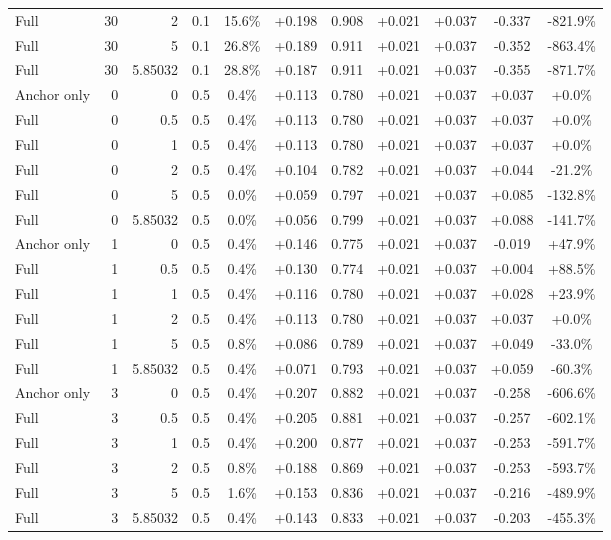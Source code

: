 \begin{table}[htbp]
\begin{tabular}{lrrrccccccc}
Full & 30 & 2 & 0.1 & 15.6\% & +0.198 & 0.908 & +0.021 & +0.037 & -0.337 & -821.9\% \\
Full & 30 & 5 & 0.1 & 26.8\% & +0.189 & 0.911 & +0.021 & +0.037 & -0.352 & -863.4\% \\
Full & 30 & 5.85032 & 0.1 & 28.8\% & +0.187 & 0.911 & +0.021 & +0.037 & -0.355 & -871.7\% \\
Anchor only & 0 & 0 & 0.5 & 0.4\% & +0.113 & 0.780 & +0.021 & +0.037 & +0.037 & +0.0\% \\
Full & 0 & 0.5 & 0.5 & 0.4\% & +0.113 & 0.780 & +0.021 & +0.037 & +0.037 & +0.0\% \\
Full & 0 & 1 & 0.5 & 0.4\% & +0.113 & 0.780 & +0.021 & +0.037 & +0.037 & +0.0\% \\
Full & 0 & 2 & 0.5 & 0.4\% & +0.104 & 0.782 & +0.021 & +0.037 & +0.044 & -21.2\% \\
Full & 0 & 5 & 0.5 & 0.0\% & +0.059 & 0.797 & +0.021 & +0.037 & +0.085 & -132.8\% \\
Full & 0 & 5.85032 & 0.5 & 0.0\% & +0.056 & 0.799 & +0.021 & +0.037 & +0.088 & -141.7\% \\
Anchor only & 1 & 0 & 0.5 & 0.4\% & +0.146 & 0.775 & +0.021 & +0.037 & -0.019 & +47.9\% \\
Full & 1 & 0.5 & 0.5 & 0.4\% & +0.130 & 0.774 & +0.021 & +0.037 & +0.004 & +88.5\% \\
Full & 1 & 1 & 0.5 & 0.4\% & +0.116 & 0.780 & +0.021 & +0.037 & +0.028 & +23.9\% \\
Full & 1 & 2 & 0.5 & 0.4\% & +0.113 & 0.780 & +0.021 & +0.037 & +0.037 & +0.0\% \\
Full & 1 & 5 & 0.5 & 0.8\% & +0.086 & 0.789 & +0.021 & +0.037 & +0.049 & -33.0\% \\
Full & 1 & 5.85032 & 0.5 & 0.4\% & +0.071 & 0.793 & +0.021 & +0.037 & +0.059 & -60.3\% \\
Anchor only & 3 & 0 & 0.5 & 0.4\% & +0.207 & 0.882 & +0.021 & +0.037 & -0.258 & -606.6\% \\
Full & 3 & 0.5 & 0.5 & 0.4\% & +0.205 & 0.881 & +0.021 & +0.037 & -0.257 & -602.1\% \\
Full & 3 & 1 & 0.5 & 0.4\% & +0.200 & 0.877 & +0.021 & +0.037 & -0.253 & -591.7\% \\
Full & 3 & 2 & 0.5 & 0.8\% & +0.188 & 0.869 & +0.021 & +0.037 & -0.253 & -593.7\% \\
Full & 3 & 5 & 0.5 & 1.6\% & +0.153 & 0.836 & +0.021 & +0.037 & -0.216 & -489.9\% \\
Full & 3 & 5.85032 & 0.5 & 0.4\% & +0.143 & 0.833 & +0.021 & +0.037 & -0.203 & -455.3\% \\

\end{tabular}
\end{table}

